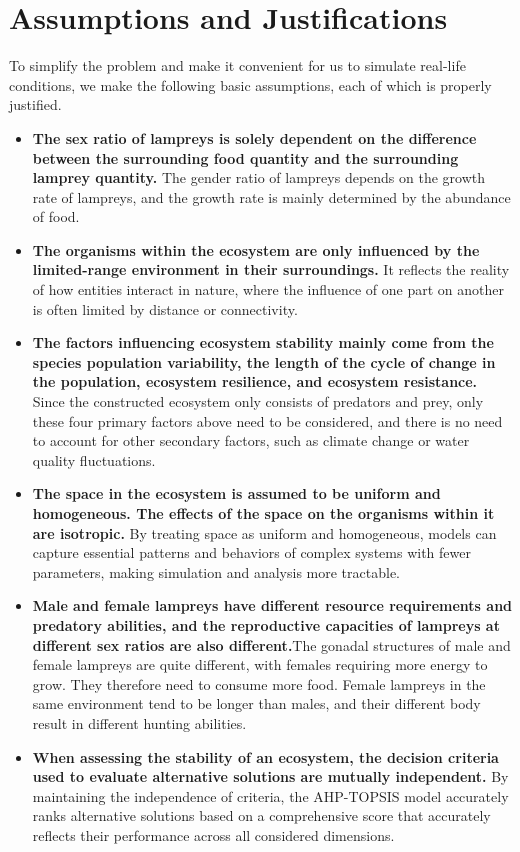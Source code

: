\documentclass{mcmthesis}
\begin{document}
\section{Assumptions and Justifications}
To simplify the problem and make it convenient for us to simulate real-life conditions, we make the following basic assumptions, each of which is properly justified. 
\begin{itemize}  %
\item \textbf{The sex ratio of lampreys is solely dependent on the difference between the surrounding food quantity and the surrounding lamprey quantity.} The gender ratio of lampreys depends on the growth rate of lampreys, and the growth rate is mainly determined by the abundance of food.\cite{1}

\item \textbf{The organisms within the ecosystem are only influenced by the limited-range environment in their surroundings.} It reflects the reality of how entities interact in nature, where the influence of one part on another is often limited by distance or connectivity. 

\item \textbf{The factors influencing ecosystem stability mainly come from the species population variability, the length of the cycle of change in the population, ecosystem resilience, and ecosystem resistance.} Since the constructed ecosystem only consists of predators and prey, only these four primary factors above need to be considered, and there is no need to account for other secondary factors, such as climate change or water quality fluctuations.

\item \textbf{The space in the ecosystem is assumed to be uniform and homogeneous. The effects of the space on the organisms within it are isotropic.} By treating space as uniform and homogeneous, models can capture essential patterns and behaviors of complex systems with fewer parameters, making simulation and analysis more tractable.

\item \textbf{Male and female lampreys have different resource requirements and predatory abilities, and the reproductive capacities of lampreys at different sex ratios are also different.}The gonadal structures of male and female lampreys are quite different, with females requiring more energy to grow. They therefore need to consume more food. Female lampreys in the same environment tend to be longer than males, and their different body result in different hunting abilities.\cite{2}

\item \textbf{When assessing the stability of an ecosystem, the decision criteria used to evaluate alternative solutions are mutually independent.} By maintaining the independence of criteria, the AHP-TOPSIS model accurately ranks alternative solutions based on a comprehensive score that accurately reflects their performance across all considered dimensions.


\end{itemize}  %
\end{document}
